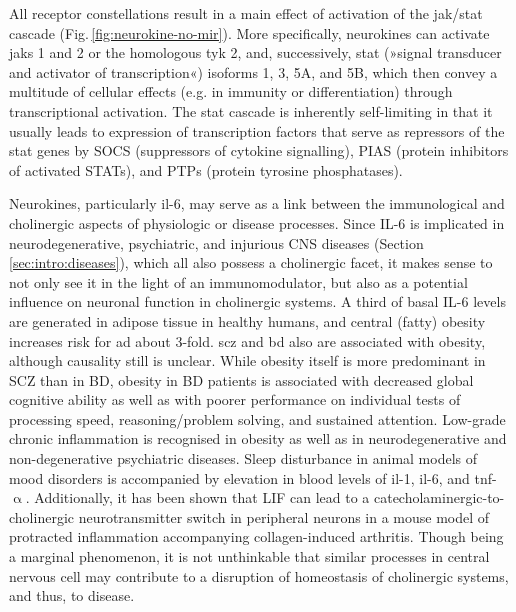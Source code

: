 All receptor constellations result in a main effect of activation of the \acs{jak}/\acs{stat} cascade (Fig.\,\ref{fig:neurokine-no-mir}). More specifically, neurokines can activate \acfp{jak} 1 and 2 or the homologous \ac{tyk} 2, and, successively, \ac{stat} (»signal transducer and activator of transcription«) isoforms 1, 3, 5A, and 5B, which then convey a multitude of cellular effects (e.g. in immunity or differentiation) through transcriptional activation. The \ac{stat} cascade is inherently self-limiting in that it usually leads to expression of transcription factors that serve as repressors of the \ac{stat} genes by SOCS (suppressors of cytokine signalling), PIAS (protein inhibitors of activated STATs), and PTPs (protein tyrosine phosphatases).\cite{Rawlings2004}

Neurokines, particularly \ac{il}-6, may serve as a link between the immunological and cholinergic aspects of physiologic or disease processes. Since IL-6 is implicated in neurodegenerative, psychiatric, and injurious CNS diseases (Section \ref{sec:intro:diseases}), which all also possess a cholinergic facet, it makes sense to not only see it in the light of an immunomodulator, but also as a potential influence on neuronal function in cholinergic systems. A third of basal IL-6 levels are generated in adipose tissue in healthy humans,\cite{Mohamed-Ali1997} and central (fatty) obesity increases risk for \ac{ad} about 3-fold.\cite{Gustafson2004, Profenno2010} \Ac{scz} and \ac{bd} also are associated with obesity, although causality still is unclear. While obesity itself is more predominant in SCZ than in BD, obesity in BD patients is associated with decreased global cognitive ability as well as with poorer performance on individual tests of processing speed, reasoning/problem solving, and sustained attention.\cite{Depp2014} Low-grade chronic inflammation is recognised in obesity\cite{Eder2009} as well as in neurodegenerative\cite{Heppner2015} and non-degenerative psychiatric diseases.\cite{Kirkpatrick2013, Takao2013} Sleep disturbance in animal models of mood disorders is accompanied by elevation in blood levels of \ac{il}-1, \ac{il}-6, and \ac{tnf}-$\upalpha$.\cite{Hodes2015} Additionally, it has been shown that LIF can lead to a catecholaminergic-to-cholinergic neurotransmitter switch in peripheral neurons in a mouse model of protracted inflammation accompanying collagen-induced arthritis.\cite{Stangl2015} Though being a marginal phenomenon, it is not unthinkable that similar processes in central nervous cell may contribute to a disruption of homeostasis of cholinergic systems, and thus, to disease.


